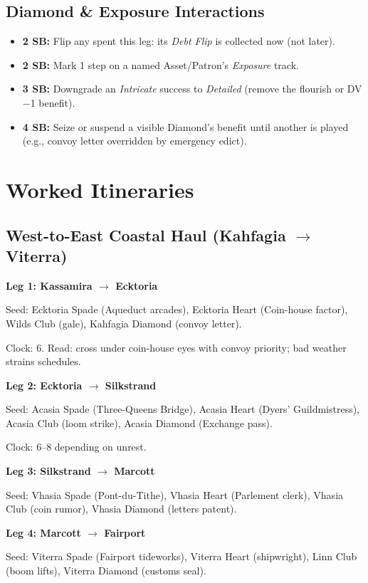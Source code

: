 \documentclass[11pt,letterpaper,twoside]{book}
\begin{document}
\subsection{Diamond \& Exposure Interactions}
\begin{itemize}
  \item \textbf{2 SB:} Flip any \diamondsuit{} spent this leg: its \emph{Debt Flip} is collected now (not later).
  \item \textbf{2 SB:} Mark 1 step on a named Asset/Patron's \emph{Exposure} track.
  \item \textbf{3 SB:} Downgrade an \emph{Intricate} success to \emph{Detailed} (remove the flourish or DV −1 benefit).
  \item \textbf{4 SB:} Seize or suspend a visible Diamond's benefit until another is played (e.g., convoy letter overridden by emergency edict).
\end{itemize}

\section{Worked Itineraries}

\subsection{West-to-East Coastal Haul (Kahfagia $\rightarrow$ Viterra)}

\textbf{Leg 1: Kassamira $\rightarrow$ Ecktoria}

Seed: Ecktoria Spade (Aqueduct arcades), Ecktoria Heart (Coin-house factor), Wilds Club (gale), Kahfagia Diamond (convoy letter).

Clock: 6. Read: cross under coin-house eyes with convoy priority; bad weather strains schedules.

\textbf{Leg 2: Ecktoria $\rightarrow$ Silkstrand}

Seed: Acasia Spade (Three-Queens Bridge), Acasia Heart (Dyers' Guildmistress), Acasia Club (loom strike), Acasia Diamond (Exchange pass).

Clock: 6--8 depending on unrest.

\textbf{Leg 3: Silkstrand $\rightarrow$ Marcott}

Seed: Vhasia Spade (Pont-du-Tithe), Vhasia Heart (Parlement clerk), Vhasia Club (coin rumor), Vhasia Diamond (letters patent).

\textbf{Leg 4: Marcott $\rightarrow$ Fairport}

Seed: Viterra Spade (Fairport tideworks), Viterra Heart (shipwright), Linn Club (boom lifts), Viterra Diamond (customs seal).
\end{document}
